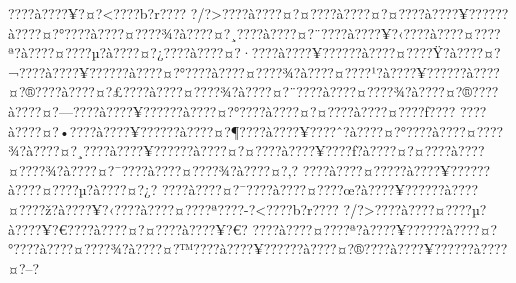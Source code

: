\documentclass[11pt, openany]{book}
\begin{document}
???\textbar{}?à???\textbar{}?¥?¤?\textless{}???\textbar{}?b?r???\textbar{}?
?/?\textgreater{}???\textbar{}?à???\textbar{}?¤?¤???\textbar{}?à???\textbar{}?¤?¤???\textbar{}?à???\textbar{}?¥?????\textbar{}?à???\textbar{}?¤?°???\textbar{}?à???\textbar{}?¤???\textbar{}?¾?à???\textbar{}?¤?¸???\textbar{}?à???\textbar{}?¤?¨???\textbar{}?à???\textbar{}?¥?‹???\textbar{}?à???\textbar{}?¤???\textbar{}?ª?à???\textbar{}?¤???\textbar{}?µ?à???\textbar{}?¤?¿???\textbar{}?à???\textbar{}?¤?·???\textbar{}?à???\textbar{}?¥?????\textbar{}?à???\textbar{}?¤???\textbar{}?Ÿ?à???\textbar{}?¤?¬???\textbar{}?à???\textbar{}?¥?????\textbar{}?à???\textbar{}?¤?°???\textbar{}?à???\textbar{}?¤???\textbar{}?¾?à???\textbar{}?¤???\textbar{}?¹?à???\textbar{}?¥?????\textbar{}?à???\textbar{}?¤?®???\textbar{}?à???\textbar{}?¤?£???\textbar{}?à???\textbar{}?¤???\textbar{}?¾?à???\textbar{}?¤?¨???\textbar{}?à???\textbar{}?¤???\textbar{}?¾?à???\textbar{}?¤?®???\textbar{}?à???\textbar{}?¤?---???\textbar{}?à???\textbar{}?¥?????\textbar{}?à???\textbar{}?¤?°???\textbar{}?à???\textbar{}?¤?¤???\textbar{}?à???\textbar{}?¤???\textbar{}?ƒ???\textbar{}?
???\textbar{}?à???\textbar{}?¤?•???\textbar{}?à???\textbar{}?¥?????\textbar{}?à???\textbar{}?¤?¶???\textbar{}?à???\textbar{}?¥???\textbar{}?ˆ?à???\textbar{}?¤?°???\textbar{}?à???\textbar{}?¤???\textbar{}?¾?à???\textbar{}?¤?¸???\textbar{}?à???\textbar{}?¥?????\textbar{}?à???\textbar{}?¤?¤???\textbar{}?à???\textbar{}?¥???\textbar{}?ƒ?à???\textbar{}?¤?¤???\textbar{}?à???\textbar{}?¤???\textbar{}?¾?à???\textbar{}?¤?¯???\textbar{}?à???\textbar{}?¤???\textbar{}?¾?à???\textbar{}?¤?‚?
???\textbar{}?à???\textbar{}?¤?­???\textbar{}?à???\textbar{}?¥?????\textbar{}?à???\textbar{}?¤???\textbar{}?µ?à???\textbar{}?¤?¿?
???\textbar{}?à???\textbar{}?¤?¯???\textbar{}?à???\textbar{}?¤???\textbar{}?œ?à???\textbar{}?¥?????\textbar{}?à???\textbar{}?¤???\textbar{}?ž?à???\textbar{}?¥?‹???\textbar{}?à???\textbar{}?¤???\textbar{}?ª???\textbar{}?-?\textless{}???\textbar{}?b?r???\textbar{}?
?/?\textgreater{}???\textbar{}?à???\textbar{}?¤???\textbar{}?µ?à???\textbar{}?¥?€???\textbar{}?à???\textbar{}?¤?¤???\textbar{}?à???\textbar{}?¥?€?
???\textbar{}?à???\textbar{}?¤???\textbar{}?ª?à???\textbar{}?¥?????\textbar{}?à???\textbar{}?¤?°???\textbar{}?à???\textbar{}?¤???\textbar{}?¾?à???\textbar{}?¤?™???\textbar{}?à???\textbar{}?¥?????\textbar{}?à???\textbar{}?¤?®???\textbar{}?à???\textbar{}?¥?????\textbar{}?à???\textbar{}?¤?--?
\end{document}
